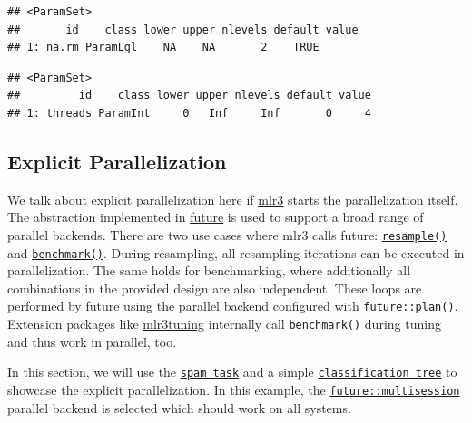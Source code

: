 \documentclass[
]{scrbook}
\newenvironment{Shaded}{\begin{snugshade}}{\end{snugshade}}
\newcommand{\CommentTok}[1]{\textcolor[rgb]{0.56,0.35,0.01}{\textit{#1}}}
\newcommand{\DecValTok}[1]{\textcolor[rgb]{0.00,0.00,0.81}{#1}}
\newcommand{\NormalTok}[1]{#1}
\newcommand{\SpecialCharTok}[1]{\textcolor[rgb]{0.00,0.00,0.00}{#1}}
\renewenvironment{Shaded} {\begin{snugshade}\small} {\end{snugshade}}
\begin{document}
\begin{verbatim}
## <ParamSet>
##       id    class lower upper nlevels default value
## 1: na.rm ParamLgl    NA    NA       2    TRUE
\end{verbatim}

\begin{Shaded}
\end{Shaded}

\begin{verbatim}
## <ParamSet>
##         id    class lower upper nlevels default value
## 1: threads ParamInt     0   Inf     Inf       0     4
\end{verbatim}

\hypertarget{explicit-parallelization}{%
\subsection{Explicit Parallelization}\label{explicit-parallelization}}

We talk about explicit parallelization here if \href{https://mlr3.mlr-org.com}{mlr3} starts the parallelization itself.
The abstraction implemented in \href{https://cran.r-project.org/package=future}{future} is used to support a broad range of parallel backends.
There are two use cases where mlr3 calls future: \href{https://mlr3.mlr-org.com/reference/resample.html}{\texttt{resample()}} and \href{https://mlr3.mlr-org.com/reference/benchmark.html}{\texttt{benchmark()}}.
During resampling, all resampling iterations can be executed in parallelization.
The same holds for benchmarking, where additionally all combinations in the provided design are also independent.
These loops are performed by \href{https://cran.r-project.org/package=future}{future} using the parallel backend configured with \href{https://www.rdocumentation.org/packages/future/topics/plan}{\texttt{future::plan()}}.
Extension packages like \href{https://mlr3tuning.mlr-org.com}{mlr3tuning} internally call \texttt{benchmark()} during tuning and thus work in parallel, too.

In this section, we will use the \href{https://mlr3.mlr-org.com/reference/mlr_tasks_spam.html}{\texttt{spam\ task}} and a simple \href{https://mlr3.mlr-org.com/reference/mlr_learners_classif.rpart.html}{\texttt{classification\ tree}} to showcase the explicit parallelization.
In this example, the \href{https://www.rdocumentation.org/packages/future/topics/multisession}{\texttt{future::multisession}} parallel backend is selected which should work on all systems.
\end{document}
